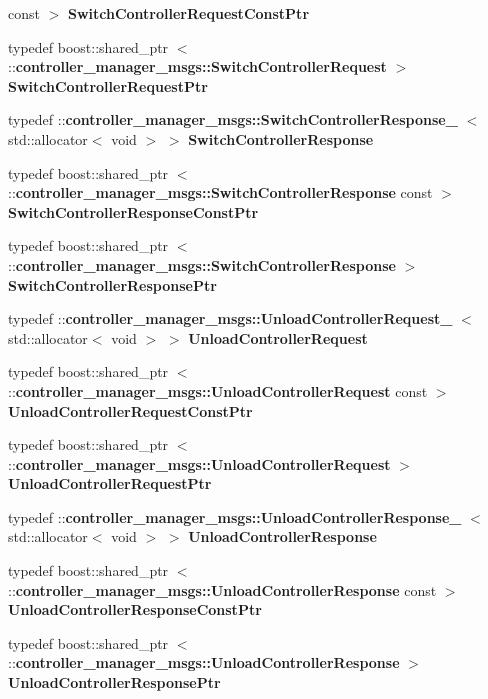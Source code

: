 \begin{DoxyCompactItemize}
const  $>$ {\bf \-Switch\-Controller\-Request\-Const\-Ptr}
\item 
typedef boost\-::shared\-\_\-ptr\*
$<$ \-::{\bf controller\-\_\-manager\-\_\-msgs\-::\-Switch\-Controller\-Request} $>$ {\bf \-Switch\-Controller\-Request\-Ptr}
\item 
typedef \*
\-::{\bf controller\-\_\-manager\-\_\-msgs\-::\-Switch\-Controller\-Response\-\_\-}\*
$<$ std\-::allocator$<$ void $>$ $>$ {\bf \-Switch\-Controller\-Response}
\item 
typedef boost\-::shared\-\_\-ptr\*
$<$ \-::{\bf controller\-\_\-manager\-\_\-msgs\-::\-Switch\-Controller\-Response} \*
const  $>$ {\bf \-Switch\-Controller\-Response\-Const\-Ptr}
\item 
typedef boost\-::shared\-\_\-ptr\*
$<$ \-::{\bf controller\-\_\-manager\-\_\-msgs\-::\-Switch\-Controller\-Response} $>$ {\bf \-Switch\-Controller\-Response\-Ptr}
\item 
typedef \*
\-::{\bf controller\-\_\-manager\-\_\-msgs\-::\-Unload\-Controller\-Request\-\_\-}\*
$<$ std\-::allocator$<$ void $>$ $>$ {\bf \-Unload\-Controller\-Request}
\item 
typedef boost\-::shared\-\_\-ptr\*
$<$ \-::{\bf controller\-\_\-manager\-\_\-msgs\-::\-Unload\-Controller\-Request} \*
const  $>$ {\bf \-Unload\-Controller\-Request\-Const\-Ptr}
\item 
typedef boost\-::shared\-\_\-ptr\*
$<$ \-::{\bf controller\-\_\-manager\-\_\-msgs\-::\-Unload\-Controller\-Request} $>$ {\bf \-Unload\-Controller\-Request\-Ptr}
\item 
typedef \*
\-::{\bf controller\-\_\-manager\-\_\-msgs\-::\-Unload\-Controller\-Response\-\_\-}\*
$<$ std\-::allocator$<$ void $>$ $>$ {\bf \-Unload\-Controller\-Response}
\item 
typedef boost\-::shared\-\_\-ptr\*
$<$ \-::{\bf controller\-\_\-manager\-\_\-msgs\-::\-Unload\-Controller\-Response} \*
const  $>$ {\bf \-Unload\-Controller\-Response\-Const\-Ptr}
\item 
typedef boost\-::shared\-\_\-ptr\*
$<$ \-::{\bf controller\-\_\-manager\-\_\-msgs\-::\-Unload\-Controller\-Response} $>$ {\bf \-Unload\-Controller\-Response\-Ptr}
\end{DoxyCompactItemize}
